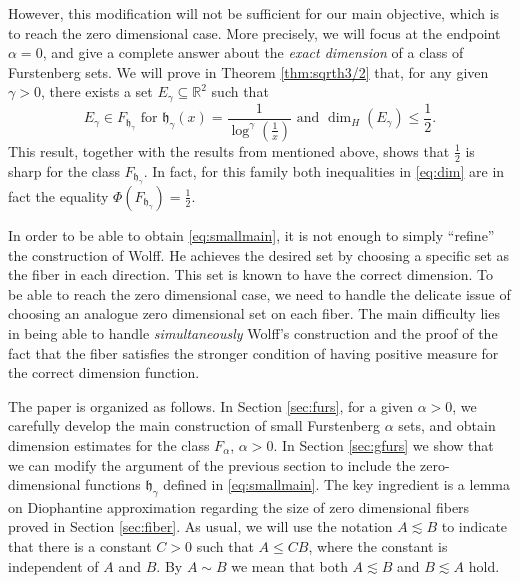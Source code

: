 \documentclass[11pt,a4paper]{amsart}
\begin{document}
However, this modification will not be sufficient for our main objective, which is to reach the zero dimensional case. More precisely, we will focus at the endpoint $\alpha=0$, and give a
complete answer about the \emph{exact dimension} of  a class of Furstenberg sets. We will prove in Theorem \ref{thm:sqrth3/2} that, for any given $\gamma>0$, there exists a set
$E_\gamma{\subseteq}{\mathbb{R}}^2$ such that 
\begin{equation}\label{eq:smallmain}
 E_\gamma\in F_{{\mathfrak{h}}_\gamma} \text{ for }{\mathfrak{h}}_\gamma(x)=\frac{1}{\log^\gamma(\frac{1}{x})} \text{ and } \dim_H(E_\gamma)\le\frac{1}{2}.
\end{equation}
This result, together with the results from \cite{mr10} mentioned above, shows that $\frac{1}{2}$ is sharp for the class $F_{{\mathfrak{h}}_\gamma}$. In fact, for this family both  inequalities in \eqref{eq:dim} are in fact the equality $\Phi(F_{{\mathfrak{h}}_\gamma})=\frac{1}{2}$.

In order to be able to obtain \eqref{eq:smallmain}, it is not enough to simply ``refine'' the construction of Wolff. He achieves the desired set by choosing a  specific set as the fiber in each direction. This set is known to have the correct dimension. To be able to reach the zero dimensional case, we need to handle the delicate issue of choosing an analogue zero dimensional set on each fiber. The main difficulty lies in being able to handle \emph{simultaneously} Wolff's construction and the proof of the fact that the fiber satisfies the stronger condition of having positive measure for the correct dimension function.

The paper is organized as follows.  In Section \ref{sec:furs}, for a given $\alpha > 0$, we carefully  develop the main construction of small Furstenberg ${\alpha}$ sets, and obtain dimension estimates for the class $F_\alpha$, $\alpha>0$. In Section \ref{sec:gfurs} we show that we can modify the argument of the previous section to include the zero-dimensional functions ${\mathfrak{h}}_{\gamma}$ defined in \eqref{eq:smallmain}. The key ingredient is a lemma on Diophantine approximation regarding the size of zero dimensional fibers proved in  Section \ref{sec:fiber}. 
As usual, we will use the notation $A\lesssim B$ to indicate that
there is a constant $C>0$ such that $A\le C B$, where the
constant is independent of $A$ and $B$. By $A\sim B$ we mean that
both $A\lesssim B$ and $B\lesssim A$ hold. 
\end{document}

